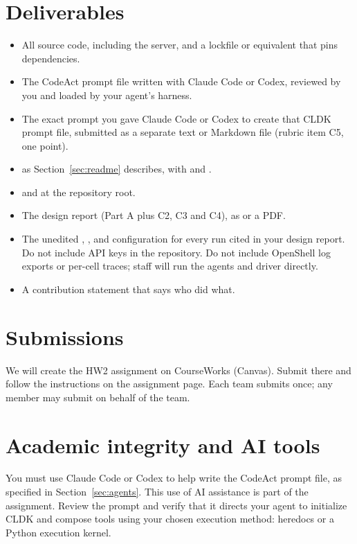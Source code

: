 \documentclass[9pt,letterpaper]{article}
\begin{document}
\section{Deliverables}
\begin{itemize}
\item All source code, including the server, and a lockfile or equivalent that
  pins dependencies.
\item The CodeAct prompt file written with Claude Code or Codex, reviewed by you
  and loaded by your agent's harness.
\item The exact prompt you gave Claude Code or Codex to create that CLDK prompt
  file, submitted as a separate text or Markdown file (rubric item C5, one point).
\item {} as Section~\ref{sec:readme} describes, with
   and .
\item {} and  at the repository root.
\item The design report (Part A plus C2, C3 and C4), as  or a PDF.
\item The unedited , , and configuration for
  every run cited in your design report. Do not include API keys in the repository.
  Do not include OpenShell log exports or per-cell traces; staff will run the
  agents and driver directly.
\item A contribution statement that says who did what.
\end{itemize}

\section{Submissions}

We will create the HW2 assignment on CourseWorks (Canvas). Submit there and follow
the instructions on the assignment page. Each team submits once; any member may
submit on behalf of the team.

\section{Academic integrity and AI tools}

You must use Claude Code or Codex to help write the CodeAct prompt file, as
specified in Section~\ref{sec:agents}. This use of AI assistance is part of the
assignment. Review the prompt and verify that it directs your agent to initialize
CLDK and compose tools using your chosen execution method: heredocs or a Python
execution kernel.
\end{document}
